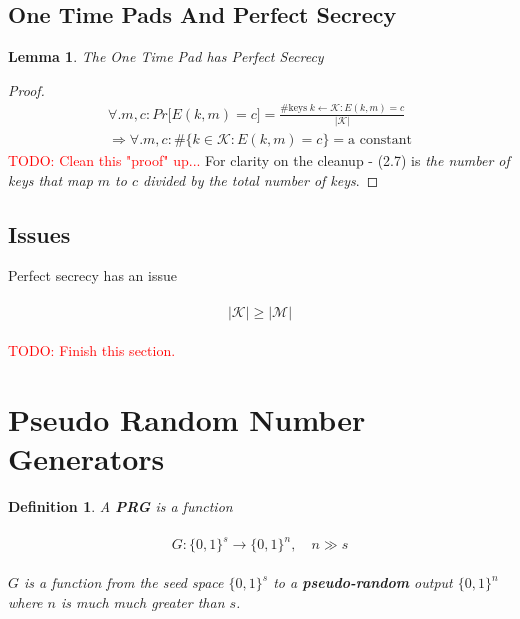 \documentclass[11pt,a4paper]{report}
\newcommand\todo[1]{\noindent\textcolor{red}{TODO: #1}}
\newtheorem{definition}{Definition}
\newtheorem{lemma}{Lemma}
\begin{document}
\subsection{One Time Pads And Perfect Secrecy}
\begin{lemma}
The One Time Pad has Perfect Secrecy
\end{lemma}

\begin{proof}
\begin{gather}
	\forall.m,c : Pr \big\lbrack E(k, m) = c \big\rbrack = 
		\frac{\textrm{\#keys} \; k \leftarrow \mathscr{K} : E(k,m) = c}{\big\lvert \mathscr{K} \big\rvert} \\
	\Rightarrow \forall.m,c : \#\{k \in \mathscr{K} : E(k,m) = c \} = \textrm{a constant}
\end{gather}
\todo{Clean this "proof" up...}
\noindent
For clarity on the cleanup - (2.7) is \emph{the number of keys that map $m$ to $c$ divided by the total number of keys}.
\end{proof}

\subsection{Issues}
Perfect secrecy has an issue

\begin{gather}
\begin{gathered}
	\big\lvert \mathscr{K} \big\rvert \ge \big\lvert \mathscr{M} \big\rvert
\end{gathered}
\end{gather}


\todo{Finish this section.}

\section{Pseudo Random Number Generators}
\begin{definition}
A \textbf{PRG} is a function

\begin{gather}
\begin{gathered}
	G : \{0,1\}^s \rightarrow \{0,1\}^n, \quad n \gg s
\end{gathered}
\end{gather}

\noindent
$G$ is a function from the seed space $\{0,1\}^s$ to a \textbf{pseudo-random} output $\{0,1\}^n$ where $n$ is much much greater than $s$.
\end{definition}
\end{document}
